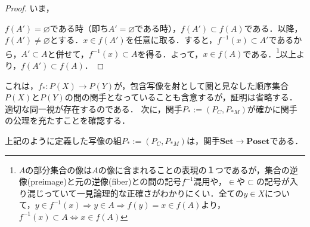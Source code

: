 \documentclass[uplatex, 12pt, dvipdfmx]{jsreport}
\begin{document}
\begin{proof}
    いま，
    \begin{center}\end{center}
    $f(A')=\varnothing$である時（即ち$A'=\varnothing$である時），$f(A')\subset f(A)$である．以降，$f(A')\ne\varnothing$とする．$x\in f(A')$を任意に取る．すると，$f^{-1}(x)\subset A'$であるから，$A'\subset A$と併せて，$f^{-1}(x)\subset A$を得る．よって，$x\in f(A)$である．\footnote{$A$の部分集合の像は$A$の像に含まれることの表現の１つであるが，集合の逆像(preimage)と元の逆像(fiber)との間の記号$f^{-1}$混用や，$\in$や$\subset$の記号が入り混じっていて一見論理的な正確さがわかりにくい．全ての$y\in X$について，$y\in f^{-1}(x)\Longrightarrow y\in A\Longrightarrow f(y)=x\in f(A)$より，$f^{-1}(x)\subset A\Longleftrightarrow x\in f(A)$}以上より，$f(A')\subset f(A)$．
\end{proof}
これは，$f_*:P(X)\to P(Y)$が，包含写像を射として圏と見なした順序集合$P(X)$と$P(Y)$の間の関手となっていることも含意するが，証明は省略する．適切な同一視が存在するのである．
次に，関手$P_*:=(P_C,P_{*M})$が確かに関手の公理を充たすことを確認する．
\begin{proposition}[共変冪集合関手$P_*$]
    上記のように定義した写像の組$P_*:=(P_C,P_{*M})$は，関手$\mathbf{Set}\to\mathbf{Poset}$である．
\end{proposition}
\end{document}
